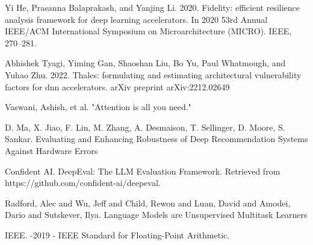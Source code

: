\documentclass[a4paper]{article}
\begin{document}
\begin{thebibliography}{Com79}

 Yi He, Prasanna Balaprakash, and Yanjing Li. 2020. Fidelity: efficient resilience analysis framework for deep learning accelerators. In 2020 53rd Annual IEEE/ACM International Symposium on Microarchitecture (MICRO). IEEE, 270–281.

 Abhishek Tyagi, Yiming Gan, Shaoshan Liu, Bo Yu, Paul Whatmough, and Yuhao Zhu. 2022. Thales: formulating and estimating architectural vulnerability factors for dnn accelerators. arXiv preprint arXiv:2212.02649

 Vaswani, Ashish, et al. 
\newblock"Attention is all you need."

 D. Ma, X. Jiao, F. Lin, M. Zhang, A. Desmaison, T. Sellinger, D. Moore, S. Sankar.
\newblock Evaluating and Enhancing Robustness of Deep Recommendation Systems Against Hardware Errors

 Confident AI.
\newblock DeepEval: The LLM Evaluation Framework. Retrieved from https://github.com/confident-ai/deepeval.

 Radford, Alec and Wu, Jeff and Child, Rewon and Luan, David and Amodei, Dario and Sutskever, Ilya. 
\newblock Language Models are Unsupervised Multitask Learners

 IEEE. 
-2019 - IEEE Standard for Floating-Point Arithmetic.

\end{thebibliography}
\end{document}
